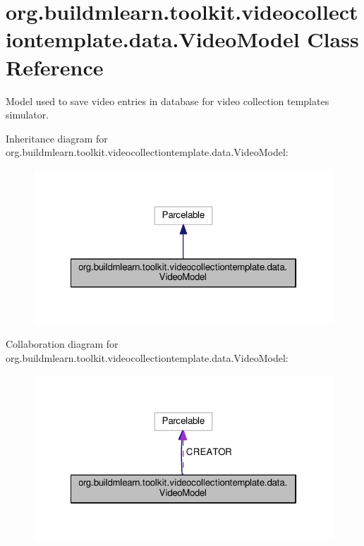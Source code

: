 \hypertarget{classorg_1_1buildmlearn_1_1toolkit_1_1videocollectiontemplate_1_1data_1_1VideoModel}{}\section{org.\+buildmlearn.\+toolkit.\+videocollectiontemplate.\+data.\+Video\+Model Class Reference}
\label{classorg_1_1buildmlearn_1_1toolkit_1_1videocollectiontemplate_1_1data_1_1VideoModel}


Model used to save video entries in database for video collection template\textquotesingle{}s simulator.  




Inheritance diagram for org.\+buildmlearn.\+toolkit.\+videocollectiontemplate.\+data.\+Video\+Model\+:
\nopagebreak
\begin{figure}[H]
\begin{center}
\leavevmode
\includegraphics[width=322pt]{classorg_1_1buildmlearn_1_1toolkit_1_1videocollectiontemplate_1_1data_1_1VideoModel__inherit__graph}
\end{center}
\end{figure}


Collaboration diagram for org.\+buildmlearn.\+toolkit.\+videocollectiontemplate.\+data.\+Video\+Model\+:
\nopagebreak
\begin{figure}[H]
\begin{center}
\leavevmode
\includegraphics[width=322pt]{classorg_1_1buildmlearn_1_1toolkit_1_1videocollectiontemplate_1_1data_1_1VideoModel__coll__graph}
\end{center}
\end{figure}
